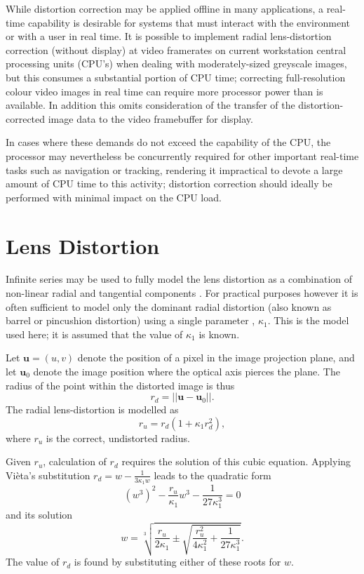 \documentclass{Stan_ECJ}
\begin{document}
While distortion correction may be applied offline in many applications, a real-time capability is desirable for systems that must interact with the environment or with a user in real time. It is possible to implement radial lens-distortion correction (without display) at video framerates on current workstation central processing units (CPU's) \cite{jrnl/ieee/mi/2002/shahidi} when dealing with moderately-sized greyscale images, but this consumes a substantial portion of CPU time; correcting full-resolution colour video images in real time can require more processor power than is available.  In addition this omits consideration of the transfer of the distortion-corrected image data to the video framebuffer for display.

In cases where these demands do not exceed the capability of the CPU, the processor may nevertheless be concurrently required for other important real-time tasks such as navigation or tracking, rendering it impractical to devote a large amount of CPU time to this activity; distortion correction should ideally be performed with minimal impact on the CPU load.  


\section{Lens Distortion}

Infinite series may be used to fully model the lens distortion as a combination of non-linear radial and tangential components \cite{book/1980/slama,jrnl/ieee/pami/1992/weng}.  For practical purposes however it is often sufficient to model only the dominant radial distortion (also known as barrel or pincushion distortion) using a single parameter \cite{jrnl/ieee/ra/1987/tsai}, $\kappa_1$.  This is the model used here; it is assumed that the value of $\kappa_1$ is known.

Let $\bm{u} = (u,v)$ denote the position of a pixel in the image projection plane, and let $\bm{u}_0$ denote the image position where the optical axis pierces the plane.  The radius of the point within the distorted image is thus 
\begin{equation}
r_d=||\bm{u}-\bm{u}_0||.
\end{equation}
The radial lens-distortion is modelled as
\begin{equation}
r_u = r_d( 1 + \kappa_1 r_d^2 ),
\label{eq:model}
\end{equation}
where $r_u$ is the correct, undistorted radius.  

Given $r_u$, calculation of $r_d$ requires the solution of this cubic equation.  Applying Vi\`{e}ta's substitution \mbox{$r_d=w-\frac{1}{3\kappa_1{}w}$} leads to the quadratic form
\begin{equation}
\left(w^3\right)^2 - \frac{r_u}{\kappa_1}w^3-\frac{1}{27\kappa_1^3}=0
\end{equation}
and its solution
\begin{equation}
w = \sqrt[3]{\frac{r_u}{2\kappa_1}\pm\sqrt{\frac{r_u^2}{4\kappa_1^2}+\frac{1}{27\kappa_1^3}}}.
\end{equation}
The value of $r_d$ is found by substituting either of these roots for $w$.
\end{document}
